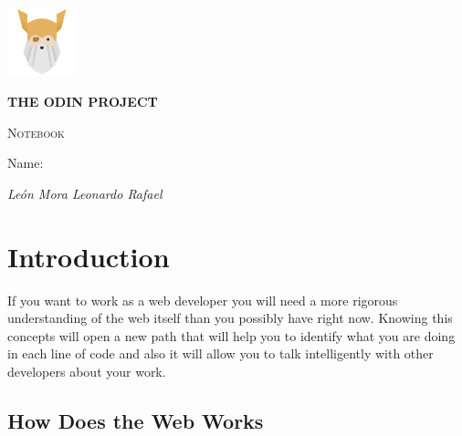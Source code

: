 \documentclass{article}
\begin{document}
	
	\begin{titlepage}
		\centering
		\vfill
		\vspace{1cm}
		\includegraphics[width=0.15\textwidth]{odin_logo.png}\par\vspace{1cm}
		\vspace{1.5cm}
		{\LARGE\bfseries THE ODIN PROJECT \par}
		{\scshape\Large Notebook \par}
		\vspace{2cm}
		\vfill
		Name: \par
		{\footnotesize\itshape León Mora Leonardo Rafael \par}
		\vfill
	\end{titlepage}
	
	\thispagestyle{empty}
	
	\tableofcontents
	
	\pagebreak
	\setcounter{page}{1}
	
	\section{Introduction}
	
	\noindent If you want to work as a web developer you will need a more rigorous understanding of the web itself than you possibly have right now. Knowing this concepts will open a new path that will help you to identify what you are doing in each line of code and also it will allow you to talk intelligently with other developers about your work.
	
	\subsection{How Does the Web Works}
	
\end{document}
